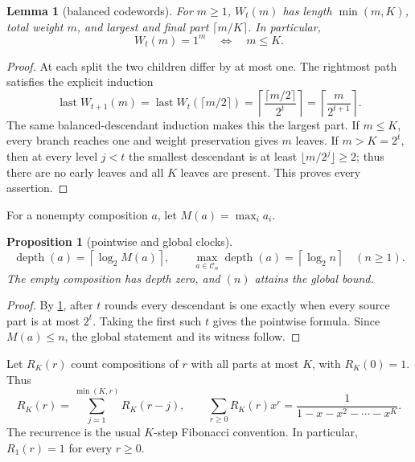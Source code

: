 \documentclass[10pt,a4paper]{amsart}
\newtheorem{proposition}[theorem]{Proposition}
\newtheorem{lemma}[theorem]{Lemma}
\theoremstyle{definition}
\theoremstyle{remark}
\newcommand{\Comp}{\mathcal C}
\newcommand{\depth}{\operatorname{depth}}
\begin{document}
\begin{lemma}[balanced codewords]\label{lem:codewords}
For $m\geq1$, $W_t(m)$ has length $\min(m,K)$, total weight $m$, and
largest and final part $\lceil m/K\rceil$.  In particular,
\begin{equation}
                   W_t(m)=1^m\quad\Longleftrightarrow\quad m\leq K.
                                                               \label{eq:ones}
\end{equation}
\end{lemma}

\begin{proof}
At each split the two children differ by at most one.  The rightmost path
satisfies the explicit induction
\[
 \operatorname{last}W_{t+1}(m)
 =\operatorname{last}W_t(\lceil m/2\rceil)
 =\left\lceil\frac{\lceil m/2\rceil}{2^t}\right\rceil
 =\left\lceil\frac{m}{2^{t+1}}\right\rceil .
\]
The same balanced-descendant induction makes this the largest part.  If
$m\leq K$, every branch reaches one and weight preservation gives $m$
leaves.  If $m>K=2^t$, then at every level $j<t$ the smallest descendant is
at least $\lfloor m/2^j\rfloor\geq2$; thus there are no early leaves and all
$K$ leaves are present.  This proves every assertion.
\end{proof}

For a nonempty composition $a$, let $M(a)=\max_i a_i$.

\begin{proposition}[pointwise and global clocks]\label{prop:clock}
\[
 \depth(a)=\left\lceil\log_2 M(a)\right\rceil,
 \qquad
 \max_{a\in\Comp_n}\depth(a)=\left\lceil\log_2 n\right\rceil
 \quad(n\geq1).                                         \label{eq:clock}
\]
The empty composition has depth zero, and $(n)$ attains the global bound.
\end{proposition}

\begin{proof}
By \cref{lem:codewords}, after $t$ rounds every descendant is one exactly
when every source part is at most $2^t$.  Taking the first such $t$ gives
the pointwise formula.  Since $M(a)\leq n$, the global statement and its
witness follow.
\end{proof}

Let $R_K(r)$ count compositions of $r$ with all parts at most $K$, with
$R_K(0)=1$.  Thus
\begin{equation}
 R_K(r)=\sum_{j=1}^{\min(K,r)}R_K(r-j),
 \qquad
 \sum_{r\geq0}R_K(r)x^r=\frac1{1-x-x^2-\cdots-x^K}.       \label{eq:RK}
\end{equation}
The recurrence is the usual $K$-step Fibonacci convention.  In particular,
$R_1(r)=1$ for every $r\geq0$.
\end{document}
